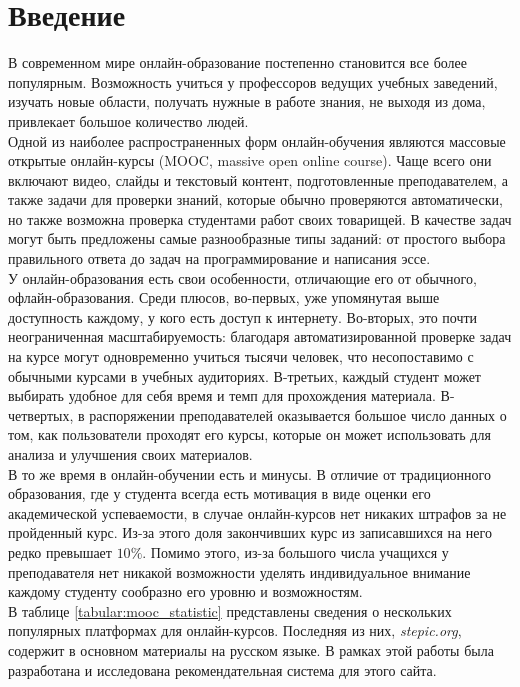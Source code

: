 \documentclass[14pt]{matmex-diploma}
\begin{document}
\section*{Введение}
В современном мире онлайн-образование постепенно становится все более популярным. Возможность учиться у профессоров ведущих учебных заведений, изучать новые области, получать нужные в работе знания, не выходя из дома, привлекает большое количество людей. 
\\\indent Одной из наиболее распространенных форм онлайн-обучения являются массовые открытые онлайн-курсы (MOOC, massive open online course). Чаще всего они включают видео, слайды и текстовый контент, подготовленные преподавателем, а также задачи для проверки знаний, которые обычно проверяются автоматически, но также возможна проверка студентами работ своих товарищей. В качестве задач могут быть предложены самые разнообразные типы заданий: от простого выбора правильного ответа до задач на программирование и написания эссе.
\\\indent У онлайн-образования есть свои особенности, отличающие его от обычного, офлайн-образования. Среди плюсов, во-первых, уже упомянутая выше доступность каждому, у кого есть доступ к интернету. Во-вторых, это почти неограниченная масштабируемость: благодаря автоматизированной проверке задач на курсе могут одновременно учиться тысячи человек, что несопоставимо с обычными курсами в учебных аудиториях. В-третьих, каждый студент может выбирать удобное для себя время и темп для прохождения материала. В-четвертых, в распоряжении преподавателей оказывается большое число данных о том, как пользователи проходят его курсы, которые он может использовать для анализа и улучшения своих материалов.
\\\indent В то же время в онлайн-обучении есть и минусы. В отличие от традиционного образования, где у студента всегда есть мотивация в виде оценки его академической успеваемости, в случае онлайн-курсов нет никаких штрафов за не пройденный курс. Из-за этого доля закончивших курс из записавшихся на него редко превышает $10\%$. Помимо этого, из-за большого числа учащихся у преподавателя нет никакой возможности уделять индивидуальное внимание каждому студенту сообразно его уровню и возможностям.
\\\indent В таблице \ref{tabular:mooc_statistic} представлены сведения о нескольких популярных платформах для онлайн-курсов. Последняя из них, \textit{stepic.org}, содержит в основном материалы на русском языке. В рамках этой работы была разработана и исследована рекомендательная система для этого сайта.
\end{document}
